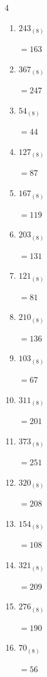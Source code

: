 \begin{multicols}{4}
\begin{enumerate}
  \item $243_{(8)}$

        $=163$

  \item $367_{(8)}$

        $=247$

\columnbreak %

\resetques

  \item $54_{(8)}$

        $=44$

  \item $127_{(8)}$

        $=87$

  \item $167_{(8)}$

        $=119$

  \item $203_{(8)}$

        $=131$

  \item $121_{(8)}$

        $=81$

  \item $210_{(8)}$

        $=136$

  \item $103_{(8)}$

        $=67$

  \item $311_{(8)}$

        $=201$

  \item $373_{(8)}$

        $=251$

  \item $320_{(8)}$

        $=208$

  \item $154_{(8)}$

        $=108$

  \item $321_{(8)}$

        $=209$

  \item $276_{(8)}$

        $=190$

  \item $70_{(8)}$

        $=56$


\end{enumerate}
\end{multicols}
